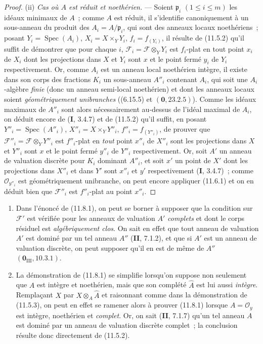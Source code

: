\begin{proof}
\medskip
\noindent(ii) \emph{Cas où $A$ est réduit et noethérien.} --- Soient
$\mathfrak p_i$ $(1\leq i\leq m)$ les idéaux minimaux de $A$~; comme $A$ est
réduit, il s'identifie canoniquement à un sous-anneau du produit des
$A_i=A/\mathfrak p_i$, qui sont des anneaux locaux noethériens~; posant
$Y_i=\operatorname{Spec}(A_i)$, $X_i=X\times_Y Y_i$, $f_i=f_{(Y_i)}$, il
résulte de (11.5.2) qu'il suffit de démontrer que pour chaque $i$,
$\mathcal F_i=\mathcal F\otimes_Y Y_i$ est $f_i$-plat en tout point $x_i$ de
$X_i$ dont les projections dans $X$ et $Y_i$ sont $x$ et le point fermé $y_i$
de $Y_i$ respectivement. Or, comme $A_i$ est un anneau local noethérien intègre,
il existe dans son corps des fractions $K_i$ un sous-anneau $A''_i$ contenant
$A_i$, qui soit une $A_i$-algèbre \emph{finie} (donc un anneau semi-local
noethérien) et dont les anneaux locaux soient \emph{géométriquement
unibranches} ((6.15.5) et $(\mathbf 0,23.2.5)$). Comme les idéaux maximaux de
$A''_i$ sont alors nécessairement au-dessus de l'idéal maximal de $A_i$, on
déduit encore de (\textbf I, 3.4.7) et de (11.5.2) qu'il suffit, en posant
$Y''_i=\operatorname{Spec}(A''_i)$, $X''_i=X\times_Y Y''_i$,
$f''_i=f_{(Y''_i)}$, de prouver que
$\mathcal F''_i=\mathcal F\otimes_Y Y''_i$ est $f''_i$-plat en \emph{tout} point
$x''_i$ de $X''_i$ sont les projections dans $X$ et $Y''_i$ sont $x$ et le
point fermé $y''_i$ de $Y''_i$ respectivement. Or, soit $A'$ un anneau de
valuation discrète pour $K_i$ dominant $A''_i$, et soit $x'$ un point de $X'$
dont les projections dans $X''_i$ et dans $Y'$ sont $x''_i$ et $y'$
respectivement (\textbf I, 3.4.7)~; comme $\mathcal O_{y''_i}$ est
géométriquement unibranche, on peut encore appliquer (11.6.1) et on en déduit
bien que $\mathcal F''_i$ est $f''_i$-plat au point $x''_i$.
\end{proof}

\begin{remarks}[11.8.2]
\label{IV.11.8.2-fr}
\begin{enumerate}[label=(\roman*)]
  \item Dans l'énoncé de (11.8.1), on peut se borner à supposer que la condition
  sur $\mathcal F'$ est vérifiée pour les anneaux de valuation $A'$ \emph{complets}
  et dont le corps résiduel est \emph{algébriquement clos}. On sait en effet que
  tout anneau de valuation $A'$ est dominé par un tel anneau $A''$
  (\textbf{II}, 7.1.2), et que si $A'$ est un anneau de valuation discrète, on
  peut supposer qu'il en est de même de $A''$
  $(\mathbf 0_{\mathrm{III}},10.3.1)$.
  \item La démonstration de (11.8.1) se simplifie lorsqu'on suppose non seulement
  que $A$ est intègre et noethérien, mais que son complété $\widehat A$ est lui
  aussi \emph{intègre}. Remplaçant $X$ par $X\otimes_A\widehat A$ et raisonnant
  comme dans la démonstration de (11.5.3), on peut en effet se ramener alors à
  prouver (11.8.1) lorsque $A=\mathcal O_y$ est intègre, noethérien et
  \emph{complet}. Or, on sait (\textbf{II}, 7.1.7) qu'un tel anneau $A$ est
  dominé par un anneau de valuation discrète complet~; la conclusion résulte
  donc directement de (11.5.2).
\end{enumerate}
\end{remarks}

